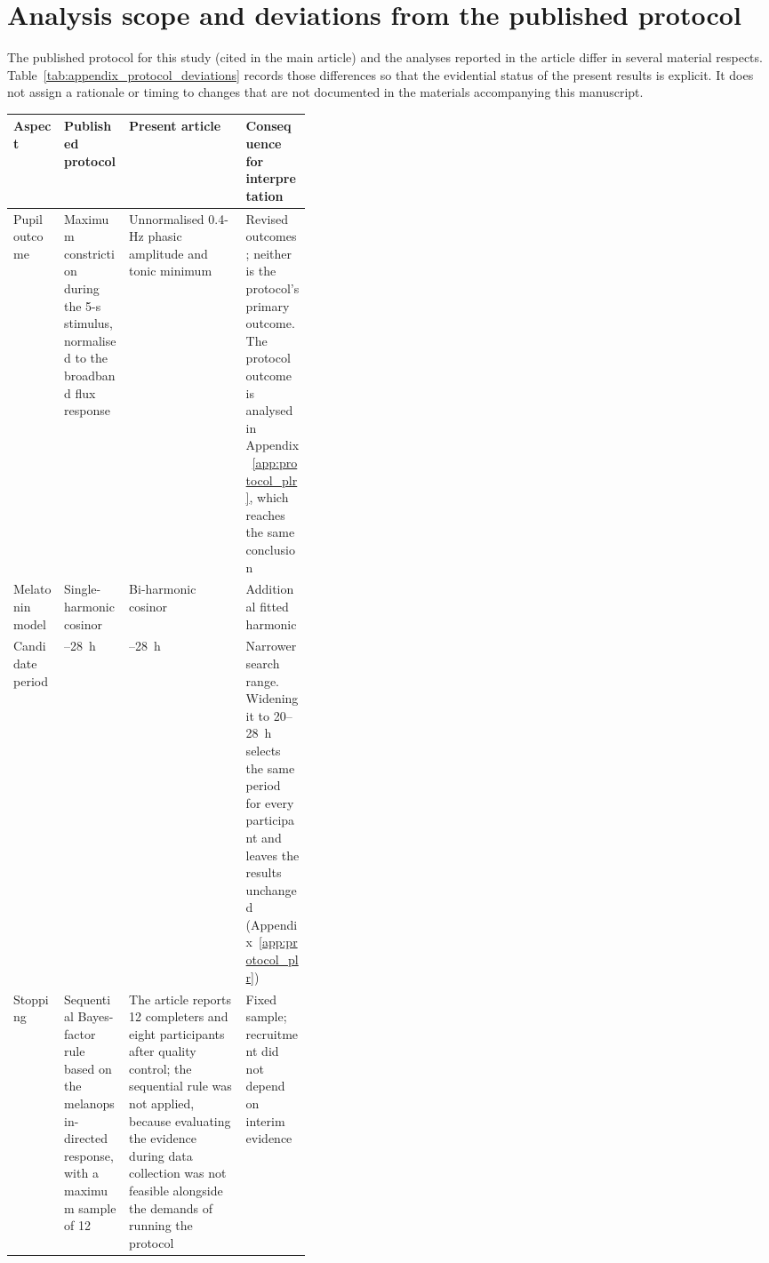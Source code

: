 \appendix

\begin{appendixbox}
\label{app:analysis_scope}
\section{Analysis scope and deviations from the published protocol}

The published protocol for this study (cited in the main article) and the analyses reported in the article differ in several material respects. Table~\ref{tab:appendix_protocol_deviations} records those differences so that the evidential status of the present results is explicit. It does not assign a rationale or timing to changes that are not documented in the materials accompanying this manuscript.

\nolinenumbers
\begin{center}
\label{tab:appendix_protocol_deviations}
\small
\begin{tabularx}{\linewidth}{@{}>{\raggedright\arraybackslash}p{0.17\linewidth}>{\raggedright\arraybackslash}X>{\raggedright\arraybackslash}X>{\raggedright\arraybackslash}p{0.22\linewidth}@{}}
\toprule
Aspect & Published protocol & Present article & Consequence for interpretation \\
\midrule
Pupil outcome & Maximum constriction during the 5-s stimulus, normalised to the broadband flux response & Unnormalised 0.4-Hz phasic amplitude and tonic minimum & Revised outcomes; neither is the protocol's primary outcome. The protocol outcome is analysed in Appendix~\ref{app:protocol_plr}, which reaches the same conclusion \\
\addlinespace
Melatonin model & Single-harmonic cosinor & Bi-harmonic cosinor & Additional fitted harmonic \\
\addlinespace
Candidate period & 20--28~h & 22--28~h & Narrower search range. Widening it to 20--28~h selects the same period for every participant and leaves the results unchanged (Appendix~\ref{app:protocol_plr}) \\
\addlinespace
Stopping & Sequential Bayes-factor rule based on the melanopsin-directed response, with a maximum sample of 12 & The article reports 12 completers and eight participants after quality control; the sequential rule was not applied, because evaluating the evidence during data collection was not feasible alongside the demands of running the protocol & Fixed sample; recruitment did not depend on interim evidence \\

\end{tabularx}
\end{center}
\end{appendixbox}
